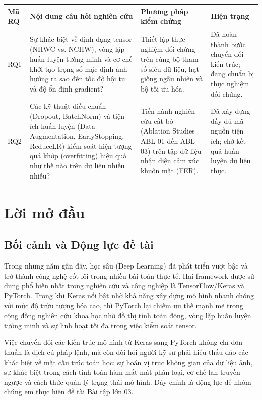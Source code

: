 \begin{longtable}{L{0.14\textwidth}L{0.38\textwidth}L{0.28\textwidth}L{0.16\textwidth}}
\toprule \textbf{Mã RQ} & \textbf{Nội dung câu hỏi nghiên cứu} & \textbf{Phương pháp kiểm chứng} & \textbf{Hiện trạng} \\
\midrule
RQ1 & Sự khác biệt về định dạng tensor (NHWC vs. NCHW), vòng lặp huấn luyện tường minh và cơ chế khởi tạo trọng số mặc định ảnh hưởng ra sao đến tốc độ hội tụ và độ ổn định gradient? & Thiết lập thực nghiệm đối chứng trên cùng bộ tham số siêu dữ liệu, hạt giống ngẫu nhiên và bộ tối ưu hóa. & Đã hoàn thành bước chuyển đổi kiến trúc; đang chuẩn bị thực nghiệm đối chứng. \\
RQ2 & Các kỹ thuật điều chuẩn (Dropout, BatchNorm) và tiện ích huấn luyện (Data Augmentation, EarlyStopping, ReduceLR) kiểm soát hiện tượng quá khớp (overfitting) hiệu quả như thế nào trên dữ liệu nhiều nhiễu? & Tiến hành nghiên cứu cắt bỏ (Ablation Studies ABL-01 đến ABL-03) trên tập dữ liệu nhận diện cảm xúc khuôn mặt (FER). & Đã xây dựng đầy đủ mã nguồn tiện ích; chờ kết quả huấn luyện dữ liệu thực. \\
\bottomrule
\end{longtable}

\chapter*{Lời mở đầu}
\section*{Bối cảnh và Động lực đề tài}
Trong những năm gần đây, học sâu (Deep Learning) đã phát triển vượt bậc và trở thành công nghệ cốt lõi trong nhiều bài toán thực tế. Hai framework được sử dụng phổ biến nhất trong nghiên cứu và công nghiệp là TensorFlow/Keras và PyTorch. Trong khi Keras nổi bật nhờ khả năng xây dựng mô hình nhanh chóng với mức độ trừu tượng hóa cao, thì PyTorch lại chiếm ưu thế mạnh mẽ trong cộng đồng nghiên cứu khoa học nhờ đồ thị tính toán động, vòng lặp huấn luyện tường minh và sự linh hoạt tối đa trong việc kiểm soát tensor.

Việc chuyển đổi các kiến trúc mô hình từ Keras sang PyTorch không chỉ đơn thuần là dịch cú pháp lệnh, mà còn đòi hỏi người kỹ sư phải hiểu thấu đáo các khác biệt về mặt cấu trúc toán học: sự hoán vị trục không gian của dữ liệu ảnh, sự khác biệt trong cách tính toán hàm mất mát phân loại, cơ chế lan truyền ngược và cách thức quản lý trạng thái mô hình. Đây chính là động lực để nhóm chúng em thực hiện đề tài Bài tập lớn 03.

